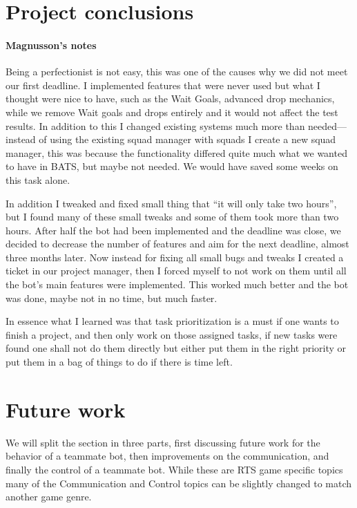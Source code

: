 \section{Project conclusions}
\paragraph{Magnusson's notes}
Being a perfectionist is not easy, this was one of the causes why we did not meet our first
deadline. I implemented features that were never used but what I thought were nice to have, such as
the Wait Goals, advanced drop mechanics, while we remove Wait goals and drops entirely and it would
not affect the test results.  In addition to this I changed existing systems much more than
needed—instead of using the existing squad manager with squads I create a new squad manager, this
was because the functionality differed quite much what we wanted to have in BATS, but maybe not
needed. We would have saved some weeks on this task alone.

In addition I tweaked and fixed small thing that ``it will only take two hours'', but I found many
of these small tweaks and some of them took more than two hours. After half the bot had been
implemented and the deadline was close, we decided to decrease the number of features and aim for
the next deadline, almost three months later. Now instead for fixing all small bugs and tweaks I
created a ticket in our project manager, then I forced myself to not work on them until all the
bot's main features were implemented. This worked much better and the bot was done, maybe not in no
time, but much faster.

In essence what I learned was that task prioritization is a must if one wants to finish a project,
and then only work on those assigned tasks, if new tasks were found one shall not do them directly
but either put them in the right priority or put them in a bag of things to do if there is time
left.

\section{Future work}
We will split the section in three parts, first discussing future work for the behavior of a
teammate bot, then improvements on the communication, and finally the control of a teammate bot.
While these are RTS game specific topics many of the Communication and Control topics can be
slightly changed to match another game genre.


